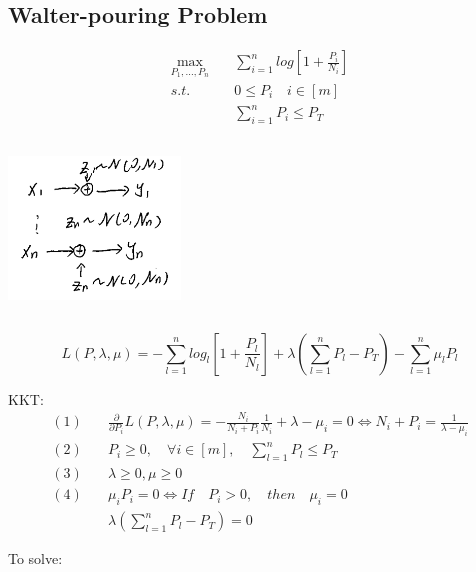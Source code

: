 



\vspace{0.5cm}
\subsection{Walter-pouring Problem}
\begin{align*}
\max_{P_1,...,P_n}\quad &\sum^n_{i=1}log[1+\frac{P_i}{N_i}]\\
s.t. \quad & 0 \leq P_i\quad i\in[m]\\
&\sum^n_{i=1}P_i\leq P_T
\end{align*}

\begin{marginfigure}
	\centering
	\includegraphics[width=1.8in,height=1.8in]{figures/ch10/figure1204_1.png}
\end{marginfigure}


\begin{equation*}
L(P, \lambda, \mu) = -\sum^n_{l=1}log_l[1+\frac{P_l}{N_l}] + \lambda(\sum^n_{l=1}P_l-P_T) - \sum^n_{l=1}\mu_lP_l
\end{equation*}

KKT:
\begin{align*}
(1) \quad &\frac{\partial}{\partial P_i}L(P, \lambda, \mu) = -\frac{N_i}{N_i+P_i}\frac{1}{N_i} + \lambda - \mu_i = 0 \Leftrightarrow N_i+P_i = \frac{1}{\lambda-\mu_i}\\
(2)\quad &P_i \geq 0,\quad \forall i \in[m],\quad \sum^n_{l=1}P_l \leq P_T\\
(3)\quad &\lambda \geq 0,\mu\geq 0\\
(4)\quad &\mu_iP_i = 0\Leftrightarrow If \quad P_i > 0, \quad then\quad \mu_i =0\\
&\lambda(\sum^n_{l=1}P_l - P_T) = 0
\end{align*}

To solve:

